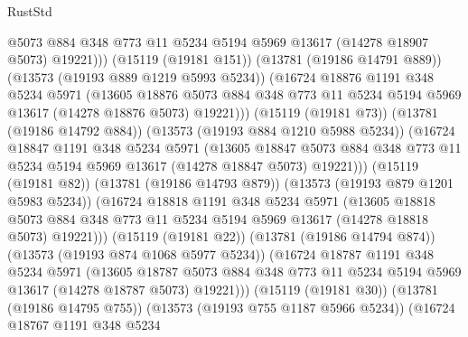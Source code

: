 \begin{lexlean}{RustStd}
\begin{coremodule}
                    @5073
                    @884
                    @348
                    @773
                    @11
                    @5234
                    @5194
                    @5969
                    @13617
                    (@14278 @18907 @5073)
                    @19221)))
              (@15119 (@19181 @151))
              (@13781 (@19186 @14791 @889))
              (@13573 (@19193 @889 @1219 @5993 @5234))
              (@16724
                @18876
                @1191
                @348
                @5234
                @5971
                (@13605
                  @18876
                  @5073
                  @884
                  @348
                  @773
                  @11
                  @5234
                  @5194
                  @5969
                  @13617
                  (@14278 @18876 @5073)
                  @19221)))
            (@15119 (@19181 @73))
            (@13781 (@19186 @14792 @884))
            (@13573 (@19193 @884 @1210 @5988 @5234))
            (@16724
              @18847
              @1191
              @348
              @5234
              @5971
              (@13605
                @18847
                @5073
                @884
                @348
                @773
                @11
                @5234
                @5194
                @5969
                @13617
                (@14278 @18847 @5073)
                @19221)))
          (@15119 (@19181 @82))
          (@13781 (@19186 @14793 @879))
          (@13573 (@19193 @879 @1201 @5983 @5234))
          (@16724
            @18818
            @1191
            @348
            @5234
            @5971
            (@13605
              @18818
              @5073
              @884
              @348
              @773
              @11
              @5234
              @5194
              @5969
              @13617
              (@14278 @18818 @5073)
              @19221)))
        (@15119 (@19181 @22))
        (@13781 (@19186 @14794 @874))
        (@13573 (@19193 @874 @1068 @5977 @5234))
        (@16724
          @18787
          @1191
          @348
          @5234
          @5971
          (@13605
            @18787
            @5073
            @884
            @348
            @773
            @11
            @5234
            @5194
            @5969
            @13617
            (@14278 @18787 @5073)
            @19221)))
      (@15119 (@19181 @30))
      (@13781 (@19186 @14795 @755))
      (@13573 (@19193 @755 @1187 @5966 @5234))
      (@16724
        @18767
        @1191
        @348
        @5234

\end{coremodule}
\end{lexlean}
